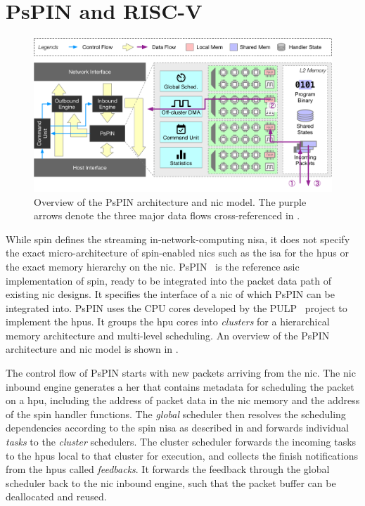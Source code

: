 \section{PsPIN and RISC-V} \label{sec:background-pspin}

\begin{figure}[tp]
    \centering
    \includegraphics[width=\textwidth]{thesis/figures/pspin-arch.pdf}
    \caption{Overview of the PsPIN architecture and \ac{nic} model.  The purple arrows denote the three major data flows cross-referenced in .} \label{fig:pspin-arch}
\end{figure}

While \ac{spin} defines the streaming in-network-computing \ac{nisa}, it does not specify the exact micro-architecture of \ac{spin}-enabled \ac{nic}s such as the \ac{isa} for the \ac{hpu}s or the exact memory hierarchy on the \ac{nic}.  PsPIN~\cite{di_girolamo_pspin_2021} is the reference \ac{asic} implementation of \ac{spin}, ready to be integrated into the packet data path of existing \ac{nic} designs.  It specifies the interface of a \ac{nic} of which PsPIN can be integrated into.  PsPIN uses the CPU cores developed by the PULP~\cite{rossi_pulp_2015} project to implement the \ac{hpu}s.  It groups the \ac{hpu} cores into \emph{clusters} for a hierarchical memory architecture and multi-level scheduling.  An overview of the PsPIN architecture and \ac{nic} model is shown in .

The control flow of PsPIN starts with new packets arriving from the \ac{nic}.  The \ac{nic} inbound engine generates a \ac{her} that contains metadata for scheduling the packet on a \ac{hpu}, including the address of packet data in the \ac{nic} memory and the address of the \ac{spin} handler functions.  The \emph{global} scheduler then resolves the scheduling dependencies according to the \ac{spin} \ac{nisa} as described in  and forwards individual \emph{tasks} to the \emph{cluster} schedulers.  The cluster scheduler forwards the incoming tasks to the \ac{hpu}s local to that cluster for execution, and collects the finish notifications from the \ac{hpu}s called \emph{feedbacks}.  It forwards the feedback through the global scheduler back to the \ac{nic} inbound engine, such that the packet buffer can be deallocated and reused.


